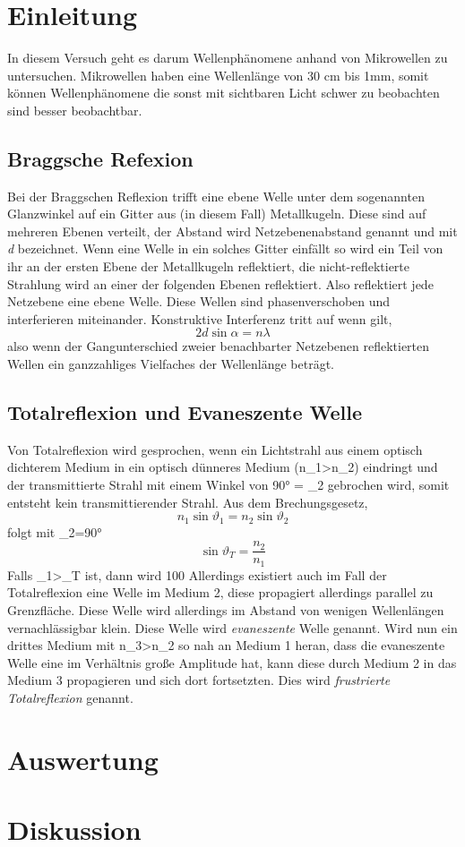 \section{Einleitung}
In diesem Versuch geht es darum Wellenphänomene anhand von Mikrowellen zu untersuchen.
Mikrowellen haben eine Wellenlänge von 30 \si{cm} bis 1\si{mm}, somit können Wellenphänomene die sonst mit sichtbaren Licht schwer zu beobachten sind besser beobachtbar.
\subsection{Braggsche Refexion}
Bei der Braggschen Reflexion trifft eine ebene Welle unter dem sogenannten Glanzwinkel \alpha auf ein Gitter aus (in diesem Fall) Metallkugeln. Diese sind auf mehreren Ebenen verteilt, der Abstand wird Netzebenenabstand genannt und mit \textit{d} bezeichnet.
Wenn eine Welle in ein solches Gitter einfällt so wird ein Teil von ihr an der ersten Ebene der Metallkugeln reflektiert, die nicht-reflektierte Strahlung wird an einer der folgenden Ebenen reflektiert. Also reflektiert jede Netzebene eine ebene Welle. Diese Wellen sind phasenverschoben und interferieren miteinander. Konstruktive Interferenz tritt auf wenn gilt,
\begin{equation}
2\textit{d}\sin \alpha=n\lambda
\end{equation}
also wenn der Gangunterschied zweier benachbarter Netzebenen reflektierten Wellen ein ganzzahliges Vielfaches der Wellenlänge beträgt.
\subsection{Totalreflexion und Evaneszente Welle}
Von Totalreflexion wird gesprochen, wenn ein Lichtstrahl aus einem optisch dichterem Medium in ein optisch dünneres Medium (n_{1}>n_{2}) eindringt und der transmittierte Strahl mit einem Winkel von 90° = \vartheta_{2} gebrochen wird, somit entsteht kein transmittierender Strahl.
Aus dem Brechungsgesetz,
\begin{equation}
n_{1}\sin \vartheta_{1}=n_{2}\sin\vartheta_{2}
\end{equation}
folgt mit \vartheta_{2}=90°
\begin{equation}
\sin\vartheta_{T}=\frac{n_{2}}{n_{1}}
\end{equation}
Falls \vartheta_{1}>\vartheta_{T} ist, dann wird 100%
Allerdings existiert auch im Fall der Totalreflexion eine Welle im Medium 2, diese propagiert allerdings parallel zu Grenzfläche. Diese Welle wird allerdings im Abstand von wenigen Wellenlängen vernachlässigbar klein. Diese Welle wird \textit{evaneszente} Welle genannt.
Wird nun ein drittes Medium mit n_{3}>n_{2} so nah an Medium 1 heran, dass die evaneszente Welle eine im Verhältnis große Amplitude hat, kann diese durch Medium 2 in das Medium 3 propagieren und sich dort fortsetzten. Dies wird \textit{frustrierte Totalreflexion} genannt.



\newpage
\section{Auswertung}

\newpage
\section{Diskussion} 